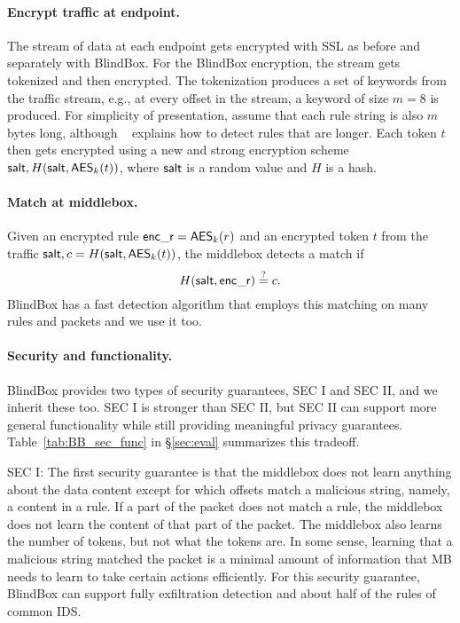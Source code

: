 \paragraph{Encrypt traffic at endpoint.}
The stream of data at each endpoint gets encrypted with SSL as before 
and separately with BlindBox. 
For the BlindBox encryption, the stream gets tokenized and then encrypted. 
The tokenization produces a set of keywords from the traffic stream, e.g.,
at every offset in the stream, a keyword of size $m=8$ is produced.
For simplicity of presentation, assume that each rule string is also $m$ bytes long, although
~\cite{blindbox} explains how to detect rules that are longer.
 Each token $t$ then gets encrypted using
a new and strong encryption scheme $\mathsf{salt}, H(\mathsf{salt}, \mathsf{AES}_k(t))$, where 
$\mathsf{salt}$ is a random value and $H$ is a hash. 

\paragraph{Match at middlebox.} 
Given an encrypted rule $\mathsf{enc\_r} = \mathsf{AES}_k(r)$ and an encrypted token $t$ from the traffic
$\mathsf{salt}, c = H(\mathsf{salt}, \mathsf{AES}_k(t))$, the middlebox detects a match if 
\[H(\mathsf{salt}, \mathsf{enc\_r}) \stackrel{?}{=} c.\] 
BlindBox has a fast detection algorithm that employs this matching on many rules and
packets and we use it too.


\paragraph{Security and functionality.}
BlindBox provides two types of security guarantees, SEC I and SEC II,  and we inherit these too. 
SEC I is stronger than SEC II, but SEC II can support more general functionality while 
still providing meaningful privacy guarantees.
Table~\ref{tab:BB_sec_func} in \S\ref{sec:eval} summarizes this tradeoff. 

SEC I: The first security guarantee is that the middlebox does not learn anything about the data
content except for which offsets match a malicious string, namely, a content in a rule. 
If a part of the packet does not match a rule, the middlebox does not learn the content 
of that part of the packet. The middlebox also learns the number of tokens, but not what
the tokens are. In some sense, learning that a malicious string matched the packet is 
a minimal amount of information that MB needs to learn to take certain actions efficiently.
 For this security guarantee, BlindBox can support fully exfiltration 
detection and about half of the rules of common IDS. 

